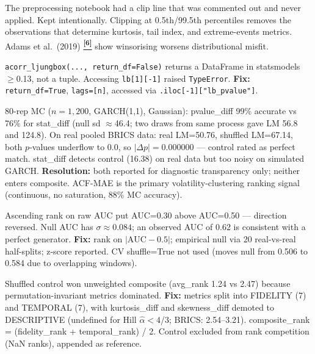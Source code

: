 \documentclass[10pt]{article}
\newcommand{\auditrow}[5]{%
  \begin{tcolorbox}[mybox={#2}{#3},
    title={\textbf{[#1]}\quad #4},
    before skip=4pt, after skip=4pt, breakable]
  \small #5
  \end{tcolorbox}}
\newcommand{\tcite}[1]{%
  \hyperlink{R:#1}{\textsuperscript{\scriptsize\textbf{[#1]}}}}
\begin{document}
\auditrow{DECISION}{Indigo}{IBg}%
  {No outlier clipping applied to log returns --- deliberate}%
  {The preprocessing notebook had a clip line that was commented out and never applied. Kept intentionally. Clipping at 0.5th/99.5th percentiles removes the observations that determine kurtosis, tail index, and extreme-events metrics. Adams et al.\ (2019)\tcite{6} show winsorising worsens distributional misfit.}

\auditrow{FIXED}{Amber}{ABg}%
  {Ljung-Box used deprecated statsmodels API}%
  {\texttt{acorr\_ljungbox(..., return\_df=False)} returns a DataFrame in statsmodels $\geq$0.13, not a tuple. Accessing \texttt{lb[1][-1]} raised \texttt{TypeError}. \textbf{Fix:} \texttt{return\_df=True}, \texttt{lags=[n]}, accessed via \texttt{.iloc[-1]["lb\_pvalue"]}.}

\auditrow{REVISED}{Amber}{ABg}%
  {ARCH-LM: both variants demoted to Descriptive; neither reliable across regimes}%
  {80-rep MC ($n=1{,}200$, GARCH(1,1), Gaussian): pvalue\_diff 99\% accurate vs 76\% for stat\_diff (null sd $\approx$46.4; two draws from same process gave LM 56.8 and 124.8). On real pooled BRICS data: real LM=50.76, shuffled LM=67.14, both $p$-values underflow to 0.0, so $|\Delta p|=0.000000$ --- control rated as perfect match. stat\_diff detects control (16.38) on real data but too noisy on simulated GARCH. \textbf{Resolution:} both reported for diagnostic transparency only; neither enters composite. ACF-MAE is the primary volatility-clustering ranking signal (continuous, no saturation, 88\% MC accuracy).}

\auditrow{FIXED}{Amber}{ABg}%
  {Discriminative AUC direction bug + no null calibration}%
  {Ascending rank on raw AUC put AUC=0.30 above AUC=0.50 --- direction reversed. Null AUC has $\sigma \approx 0.084$; an observed AUC of 0.62 is consistent with a perfect generator. \textbf{Fix:} rank on $|\text{AUC}-0.5|$; empirical null via 20 real-vs-real half-splits; z-score reported. CV shuffle=True not used (moves null from 0.506 to 0.584 due to overlapping windows).}

\auditrow{FIXED}{Amber}{ABg}%
  {Composite ranking: fidelity/temporal split + shuffled-control exclusion}%
  {Shuffled control won unweighted composite (avg\_rank 1.24 vs 2.47) because permutation-invariant metrics dominated. \textbf{Fix:} metrics split into FIDELITY (7) and TEMPORAL (7), with kurtosis\_diff and skewness\_diff demoted to DESCRIPTIVE (undefined for Hill $\hat{\alpha}<4$/$3$; BRICS: 2.54--3.21). composite\_rank = (fidelity\_rank + temporal\_rank) / 2. Control excluded from rank competition (NaN ranks), appended as reference.}
\end{document}
